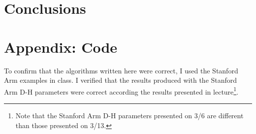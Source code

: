 \documentclass{article}
\begin{document}
\section{Conclusions}

\nocite{*}



\clearpage
\appendix
\section{Appendix: Code}

To confirm that the algorithms written here were correct, I used the Stanford Arm examples in class. I verified that the results produced with the Stanford Arm D-H parameters were correct according the results presented in lecture\footnote{Note that the Stanford Arm D-H parameters presented on 3/6 are different than those presented on 3/13.}.

\end{document}
